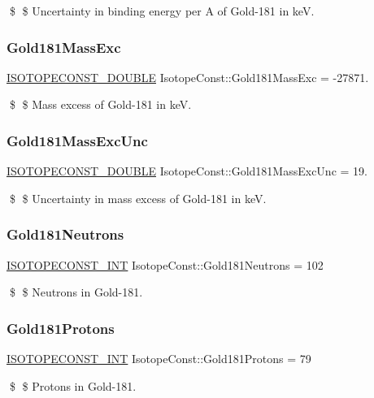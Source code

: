 \$ \$ Uncertainty in binding energy per A of Gold-\/181 in keV. \mbox{\label{group___isotope_const-_gold-_au181_ga1c0cb176d431733fbce7f456e4fc33f2}} 
\subsubsection{\texorpdfstring{Gold181\+Mass\+Exc}{Gold181MassExc}}
{\footnotesize\ttfamily \mbox{\hyperlink{group___isotope_const-_macros_ga8f45a7272ce02c0b4c65c44636ed719a}{I\+S\+O\+T\+O\+P\+E\+C\+O\+N\+S\+T\+\_\+\+D\+O\+U\+B\+LE}} Isotope\+Const\+::\+Gold181\+Mass\+Exc = -\/27871.}

\$ \$ Mass excess of Gold-\/181 in keV. \mbox{\label{group___isotope_const-_gold-_au181_ga6b98f6ab20dec5f4ef9ab721f6e58f30}} 
\subsubsection{\texorpdfstring{Gold181\+Mass\+Exc\+Unc}{Gold181MassExcUnc}}
{\footnotesize\ttfamily \mbox{\hyperlink{group___isotope_const-_macros_ga8f45a7272ce02c0b4c65c44636ed719a}{I\+S\+O\+T\+O\+P\+E\+C\+O\+N\+S\+T\+\_\+\+D\+O\+U\+B\+LE}} Isotope\+Const\+::\+Gold181\+Mass\+Exc\+Unc = 19.}

\$ \$ Uncertainty in mass excess of Gold-\/181 in keV. \mbox{\label{group___isotope_const-_gold-_au181_gad2dbc7d894b71937e8e2d815badb7c1a}} 
\subsubsection{\texorpdfstring{Gold181\+Neutrons}{Gold181Neutrons}}
{\footnotesize\ttfamily \mbox{\hyperlink{group___isotope_const-_macros_ga5f18360b3e99483a35c32d789e62621c}{I\+S\+O\+T\+O\+P\+E\+C\+O\+N\+S\+T\+\_\+\+I\+NT}} Isotope\+Const\+::\+Gold181\+Neutrons = 102}

\$ \$ Neutrons in Gold-\/181. \mbox{\label{group___isotope_const-_gold-_au181_gac01604320ca71469d3ef89b69df1a3e8}} 
\subsubsection{\texorpdfstring{Gold181\+Protons}{Gold181Protons}}
{\footnotesize\ttfamily \mbox{\hyperlink{group___isotope_const-_macros_ga5f18360b3e99483a35c32d789e62621c}{I\+S\+O\+T\+O\+P\+E\+C\+O\+N\+S\+T\+\_\+\+I\+NT}} Isotope\+Const\+::\+Gold181\+Protons = 79}

\$ \$ Protons in Gold-\/181. 